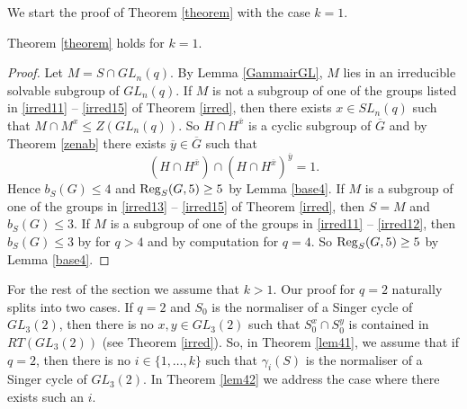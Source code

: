  We start the proof of Theorem \ref{theorem} with the case $k=1.$
 
 
\begin{Th}
Theorem {\rm \ref{theorem}} holds for $k=1.$ 
\end{Th}
\begin{proof}
Let $M = S \cap GL_n(q)$. By Lemma \ref{GammairGL}, $M$ lies in an irreducible solvable subgroup of $GL_n(q).$
If $M$ is not a subgroup of one of the groups listed in  \eqref{irred11} -- \eqref{irred15} of Theorem \ref{irred}, then there exists $x \in SL_n(q)$ such that $M \cap M^x \le Z(GL_n(q)).$ So $H \cap H^{\overline{x}}$ is a cyclic subgroup of $\overline{G}$ and by Theorem \ref{zenab} there exists $\overline{y} \in \overline{G}$ such that 
$$(H \cap H^{\overline{x}}) \cap (H \cap H^{\overline{x}})^{\overline{y}}=1.$$ Hence $b_S(G) \le 4$ and $\mathrm{Reg}_S(G,5) \ge 5$ by Lemma \ref{base4}.
If  $M$ is a subgroup of one of the groups in \eqref{irred13} -- \eqref{irred15} of Theorem \ref{irred}, then $S=M$ and $b_S(G) \le 3.$ If  $M$ is a subgroup of one of the groups in \eqref{irred11} -- \eqref{irred12}, then $b_S(G) \le 3$ by \cite[Table 3]{burness} for $q>4$ and by computation for $q=4.$ So $\mathrm{Reg}_S(G,5) \ge 5$ by Lemma \ref{base4}.
\end{proof}


 For the rest of the section we assume that $k>1.$ Our proof for $q=2$ naturally splits into two cases.  If $q=2$ and $S_0$ is the normaliser of a Singer cycle of $GL_3(2)$, then there is no $x, y \in GL_3(2)$ such that $S_0^{x} \cap S_0^{y}$ is contained in $RT(GL_3(2))$ (see Theorem \ref{irred}). So, in Theorem \ref{lem41}, we assume that if $q=2$, then there is no  $i \in \{1, \ldots, k\}$ such that $\gamma_i(S)$ is the normaliser of a Singer cycle of $GL_3(2).$ In Theorem \ref{lem42} we address the case where there exists such an $i$.


